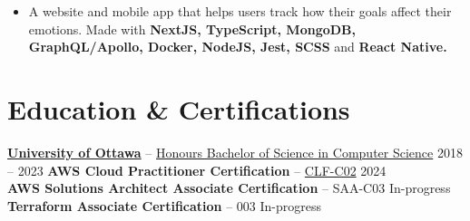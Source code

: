 \documentclass[letterpaper]{article}
\begin{document}
\vspace{-5pt}
\begin{itemize}
    \item A website and mobile app that helps users track how their goals affect their emotions. Made with \textbf{NextJS, TypeScript, MongoDB, GraphQL/Apollo, Docker, NodeJS, Jest, SCSS} and \textbf{React Native.}
\end{itemize}

\vspace{-7.5pt}
\section{Education \& Certifications}
\textbf{\href{https://www.uottawa.ca}{University of Ottawa}} -- \href{https://1drv.ms/b/s!AqCqUgZCz_Syg4xQ3hZgNf2SuSkbxQ?e=zdgV0F}{Honours Bachelor of Science in Computer Science} \hfill 2018 -- 2023 \newline
\textbf{AWS Cloud Practitioner Certification} -- \href{https://www.credly.com/badges/4290f058-e6aa-484e-924a-f2e20db8627a/public_url}{CLF-C02} \hfill 2024 \\
\textbf{AWS Solutions Architect Associate Certification} -- SAA-C03 \hfill In-progress\\
\textbf{Terraform Associate Certification} -- 003 \hfill In-progress
\end{document}
